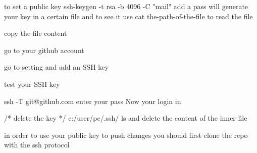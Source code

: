 to set a public key  
ssh-keygen -t rsa -b 4096 -C "mail" 
add a pass 
will generate your key in a certain file and to see it 
use cat the-path-of-the-file  
to read the file 

copy the file content 

go to your github account 

go to setting and add an SSH key 

test your SSH key 

ssh -T git@github.com 
enter your pass 
Now your login in 

/* delete the key */
c:/user/pc/.ssh/
ls 
and delete the content of the inner file 

in order to use your public key to push changes you should first clone the repo 
with the ssh protocol 